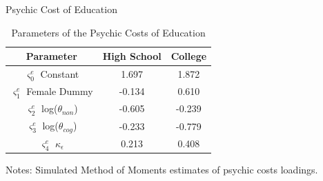 \documentclass{beamer}
\begin{document}
\begin{frame}[label=Psychic Costs]{Psychic Cost of Education}
\begin {table}[H]
\caption {Parameters of the Psychic Costs of Education} \label{tab:title} 
\begin{center}
  \begin{tabular}{c |  c  c    }
      \hline
Parameter & High School & College\\\hline
 $\varsigma_0^e$ Constant & 1.697& 1.872\\
 $\varsigma_1^e$ Female Dummy &-0.134& 0.610\\
 $\varsigma_2^e$ log($\theta_{non}$) &-0.605& -0.239\\
 $\varsigma_3^e$ log($\theta_{cog}$) &-0.233 &-0.779\\
 $\varsigma_4^e$ $\kappa_{\epsilon}$ & 0.213 &0.408 \\\hline

\end{tabular}
\end{center}
\tiny{Notes: Simulated Method of Moments estimates of psychic costs loadings.  }
\end{table}

\begin{itemize}


\end{itemize}
\end{frame}
\end{document}
